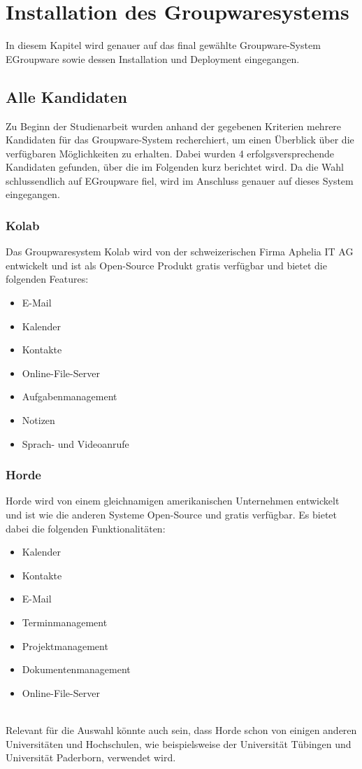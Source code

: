 \chapter{Installation des Groupwaresystems}

In diesem Kapitel wird genauer auf das final gewählte Groupware-System EGroupware sowie dessen Installation und Deployment eingegangen.

\section{Alle Kandidaten}

Zu Beginn der Studienarbeit wurden anhand der gegebenen Kriterien mehrere Kandidaten für das Groupware-System recherchiert, um einen Überblick über die verfügbaren Möglichkeiten zu erhalten.
Dabei wurden 4 erfolgsversprechende Kandidaten gefunden, über die im Folgenden kurz berichtet wird.
Da die Wahl schlussendlich auf EGroupware fiel, wird im Anschluss genauer auf dieses System eingegangen.

\subsection{Kolab}

Das Groupwaresystem Kolab wird von der schweizerischen Firma Aphelia IT AG entwickelt und ist als Open-Source Produkt gratis verfügbar und bietet die folgenden Features:
\begin{itemize}
    \item E-Mail
    \item Kalender
    \item Kontakte
    \item Online-File-Server
    \item Aufgabenmanagement
    \item Notizen
    \item Sprach- und Videoanrufe
\end{itemize}
\autocite{kolab}

\subsection{Horde}

Horde wird von einem gleichnamigen amerikanischen Unternehmen entwickelt und ist wie die anderen Systeme Open-Source und gratis verfügbar. Es bietet dabei die folgenden Funktionalitäten:
\begin{itemize}
    \item Kalender
    \item Kontakte
    \item E-Mail
    \item Terminmanagement
    \item Projektmanagement
    \item Dokumentenmanagement
    \item Online-File-Server
\end{itemize}
\autocite{horde}
\\
Relevant für die Auswahl könnte auch sein, dass Horde schon von einigen anderen Universitäten und Hochschulen, wie beispielsweise der Universität Tübingen und Universität Paderborn, verwendet wird.

